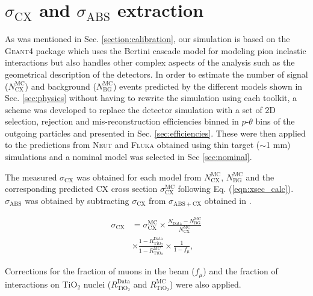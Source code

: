\section{$\sigma_{\mathrm{CX}}$ and $\sigma_{\mathrm{ABS}}$ extraction}\label{sec:xsec}
{\color{red}
As was mentioned in Sec. \ref{section:calibration}, our simulation is based on the \textsc{Geant4} package which uses the Bertini cascade model for modeling pion inelastic interactions but also handles other complex aspects of the analysis such as the geometrical description of the detectors. In order to estimate the number of signal ($N_{\mathrm{CX}}^{\mathrm{MC}}$) and background ($N_{\mathrm{BG}}^{\mathrm{MC}}$) events predicted by the different models shown in Sec. \ref{sec:physics} without having to rewrite the simulation using each toolkit, a scheme was developed to replace the detector simulation with a set of 2D selection, rejection and mis-reconstruction efficiencies binned in $p$-$\theta$ bins of the outgoing particles and presented in Sec. \ref{sec:efficiencies}. These were then applied to the predictions from \textsc{Neut} and \textsc{Fluka} obtained using thin target {\color{red}($\sim$1 mm)} simulations and a nominal model was selected in Sec \ref{sec:nominal}.

The measured $\sigma_{\mathrm{CX}}$ was obtained for each model from $N_{\mathrm{CX}}^{\mathrm{MC}}$, $N_{\mathrm{BG}}^{\mathrm{MC}}$ and the corresponding predicted CX cross section $\sigma_{\mathrm{CX}}^{\mathrm{MC}}$ following Eq. (\ref{eqn:xsec_calc}). $\sigma_{\mathrm{ABS}}$ was obtained by subtracting $\sigma_{\mathrm{CX}}$ from $\sigma_{\mathrm{ABS+CX}}$ obtained in \cite{duet}.

 \begin{equation} \label{eqn:xsec_calc}
 \begin{aligned}
 \sigma_{\mathrm{CX}} &= 
 \sigma_{\mathrm{CX}}^{\mathrm{MC}}
 \times \frac{N_{\mathrm{Data}}-N_{\mathrm{BG}}^{\mathrm{MC}}}{N_{\mathrm{CX}}^{\mathrm{MC}}} \\
 &\times
 \frac{1-R_{\mathrm{TiO}_2}^{\mathrm{Data}}}{1-R_{\mathrm{TiO}_2}^{\mathrm{MC}}}
 \times \frac{1}{1-f_{\mu}},
 \end{aligned}
 \end{equation} 

Corrections for the fraction of muons in the beam ($f_{\mu}$) and the fraction of interactions on TiO$_2$ nuclei ($R_{\mathrm{TiO}_2}^{\mathrm{Data}}$ and $R_{\mathrm{TiO}_2}^{\mathrm{MC}}$) were also applied. 

}
